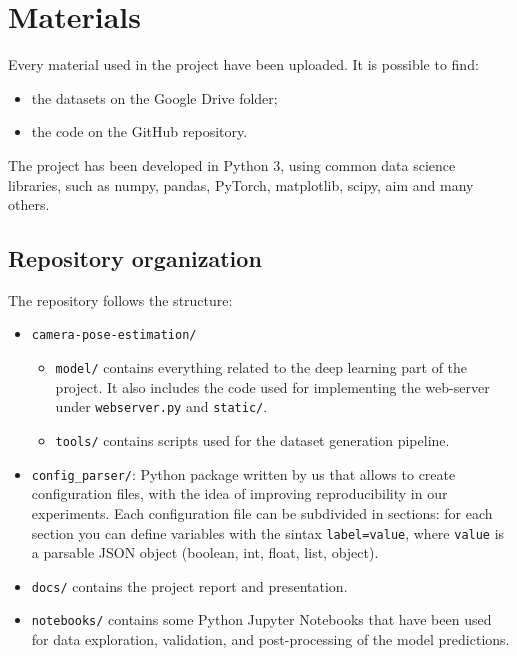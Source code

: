 \section{Materials}
Every material used in the project have been uploaded. It is possible to find:
\begin{itemize}
    \item the datasets on the Google Drive folder;
    \item the code on the GitHub repository.
\end{itemize}

The project has been developed in Python 3, using common data science libraries, such as numpy, pandas, PyTorch, matplotlib, scipy, aim and many others.

\subsection{Repository organization}
The repository follows the structure:
\begin{itemize}
    \item \texttt{camera-pose-estimation/}
    \begin{itemize}
        \item \texttt{model/} contains everything related to the deep learning part of the project. It also includes the code used for implementing the web-server under \texttt{webserver.py} and \texttt{static/}.
        \item \texttt{tools/} contains scripts used for the dataset generation pipeline.
    \end{itemize}
    \item \texttt{config\_parser/}: Python package written by us that allows to create configuration files, with the idea of improving reproducibility in our experiments. Each configuration file can be subdivided in sections: for each section you can define variables with the sintax \texttt{label=value}, where \texttt{value} is a parsable JSON object (boolean, int, float, list, object).
    \item \texttt{docs/} contains the project report and presentation.
    \item \texttt{notebooks/} contains some Python Jupyter Notebooks that have been used for data exploration, validation, and post-processing of the model predictions.
\end{itemize}

